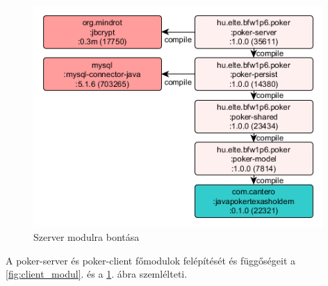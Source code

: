 \begin{figure}[h!]
	\caption{Szerver modulra bontása}
	\label{fig:server_modul}
	\centering
	\includegraphics[width=11cm]{developer-documentation/images/poker-server-deps.png}
\end{figure}
A poker-server és poker-client főmodulok felépítését és függőségeit a \ref{fig:client_modul}. és a \ref{fig:server_modul}. ábra szemlélteti.

